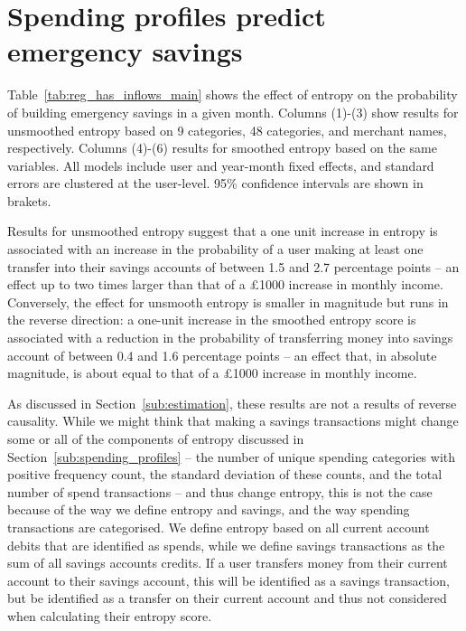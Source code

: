 
\section{Spending profiles predict emergency savings}%
\label{sec:results}

Table~\ref{tab:reg_has_inflows_main} shows the effect of entropy on the
probability of building emergency savings in a given month. Columns (1)-(3)
show results for unsmoothed entropy based on 9 categories, 48 categories, and
merchant names, respectively. Columns (4)-(6) results for smoothed entropy
based on the same variables. All models include user and year-month fixed
effects, and standard errors are clustered at the user-level. 95\% confidence
intervals are shown in brakets.



Results for unsmoothed entropy suggest that a one unit increase in entropy is
associated with an increase in the probability of a user making at least one
transfer into their savings accounts of between 1.5 and 2.7 percentage points
-- an effect up to two times larger than that of a \pounds1000 increase in
monthly income. Conversely, the effect for unsmooth entropy is smaller in
magnitude but runs in the reverse direction: a one-unit increase in the
smoothed entropy score is associated with a reduction in the probability of
transferring money into savings account of between 0.4 and 1.6 percentage
points -- an effect that, in absolute magnitude, is about equal to that of a
\pounds1000 increase in monthly income.

As discussed in Section~\ref{sub:estimation}, these results are not a results
of reverse causality. While we might think that making a savings transactions
might change some or all of the components of entropy discussed in
Section~\ref{sub:spending_profiles} -- the number of unique spending categories
with positive frequency count, the standard deviation of these counts, and the
total number of spend transactions -- and thus change entropy, this is not the
case because of the way we define entropy and savings, and the way spending
transactions are categorised. We define entropy based on all current account
debits that are identified as spends, while we define savings transactions as
the sum of all savings accounts credits. If a user transfers money from their
current account to their savings account, this will be identified as a savings
transaction, but be identified as a transfer on their current account and thus
not considered when calculating their entropy score.

